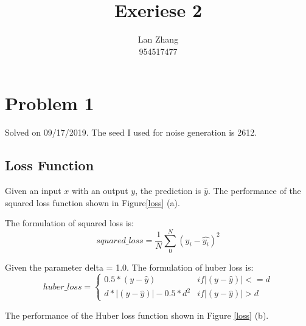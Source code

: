 \documentclass{article}
\title{Exeriese 2}
\author{%
  Lan Zhang\\
  954517477\\
}
\begin{document}
\maketitle

\section{Problem 1}

Solved on 09/17/2019. The seed I used for noise generation is 2612. 

\subsection{Loss Function}

Given an input $x$ with an output $y$, the prediction is $\hat{y}$. The performance of the squared loss function shown in Figure\ref{loss} (a). 


The formulation of squared loss is:
$$squared\_loss = \frac{1}{N}\sum_0^N{(y_i - \hat{y_i})^2}$$

Given the parameter delta = 1.0. The formulation of huber loss is:
$$huber\_loss = \left\{\begin{matrix}
0.5 *  (y - \hat{y})          & if |(y - \hat{y})| <= d\\ 
d*|(y - \hat{y})| - 0.5 * d^2 & if |(y - \hat{y})| >  d
\end{matrix}\right.$$

The performance of the Huber loss function shown in Figure \ref{loss} (b). 
\end{document}
